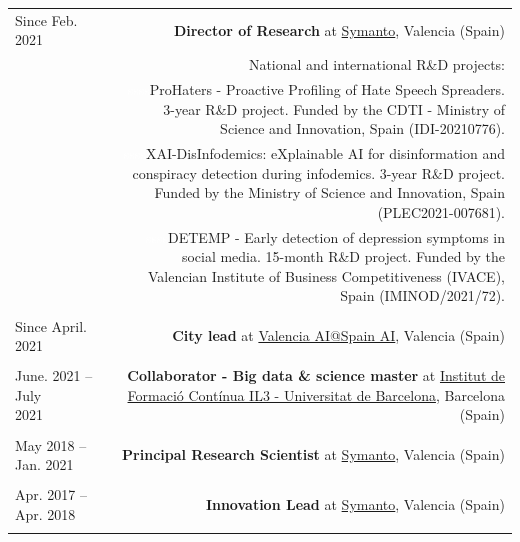 \documentclass[10pt]{article}
\begin{document}
\begin{tabular}{L!{\VRule}R}

Since Feb.~ 2021 &{\textbf{Director of Research} at \href{https://www.symanto.com/}{Symanto}, Valencia (Spain)}\\
&\scriptsize{National and international R\&D projects:}\\
&\scriptsize{\textcolor{white}{ssss}ProHaters - Proactive Profiling of Hate Speech Spreaders. 3-year R\&D project. Funded by the CDTI - Ministry of Science and Innovation, Spain (IDI-20210776).}\\
&\scriptsize{\textcolor{white}{ssss}XAI-DisInfodemics: eXplainable AI for disinformation and conspiracy detection during infodemics. 3-year R\&D project. Funded by the Ministry of Science and Innovation, Spain (PLEC2021-007681).}\\
&\scriptsize{\textcolor{white}{ssss}DETEMP - Early detection of depression symptoms in social media. 15-month R\&D project. Funded by the Valencian Institute of Business Competitiveness (IVACE), Spain (IMINOD/2021/72)}. \\&\\

Since April.~ 2021 &{\textbf{City lead} at \href{https://www.spain-ai.com/}{Valencia AI@Spain AI}, Valencia (Spain)}\\
&\\

June. 2021 -- July 2021~~~~~ &{\textbf{Collaborator - Big data \& science master} at  \href{https://www.il3.ub.edu/}{Institut de Formació Contínua IL3 - Universitat de Barcelona}, Barcelona (Spain)}\\
&\\

May 2018 -- Jan. 2021~~~ &{\textbf{Principal Research Scientist} at \href{https://www.symanto.com/}{Symanto}, Valencia (Spain)}\\&\\

Apr. 2017 -- Apr. 2018~~~ &{\textbf{Innovation Lead} at \href{https://www.symanto.com/}{Symanto}, Valencia (Spain)}\\&\\
\end{tabular}
\end{document}
